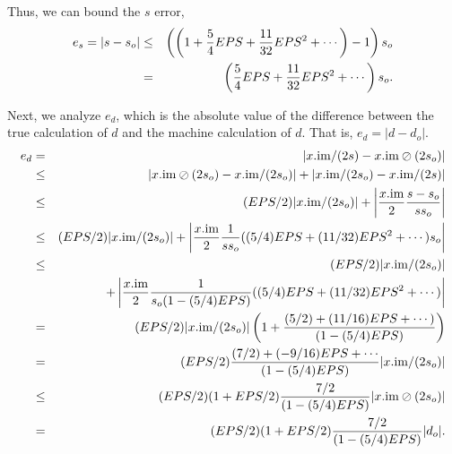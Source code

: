 Thus, we can bound the $s$ error, 
\begin{eqnarray*}
e_s = |s - s_o|&\le&\left(\left(1 + {5 \over 4} EPS + {11 \over 32} EPS^2 +\cdots\right) - 1\right) s_o\\
&=& \left({5 \over 4} EPS +
{11 \over 32} EPS^2 +\cdots\right) s_o.
\end{eqnarray*}

Next, we analyze $e_d$, which is the absolute value of the difference between the true calculation of $d$ and the machine calculation of $d$.  That is, $e_d = |d - d_o|.$
\begin{eqnarray*}
e_d &=& |x.{\rm im}/(2s) - x.{\rm im} \oslash (2 s_o)|\\
&\le& |x.{\rm im} \oslash (2 s_o) - x.{\rm im} / (2 s_o)| + 
|x.{\rm im}/(2s_o) - x.{\rm im}/(2s) |\\
&\le& (EPS/2) |x.{\rm im} / (2 s_o)| + \left|{x.{\rm im} \over 2} {s - s_o \over s s_o} \right|\\
&\le& (EPS/2) |x .{\rm im}/ (2
s_o)| +\left|{x.{\rm im} \over 2} {1 \over s s_o} ((5/4)EPS + (11/32)EPS^2+\cdots) s_o\right|\\
&\le& (EPS/2) |x.{\rm im} / (2
s_o)| \\
&&+ \left|{x.{\rm im} \over 2} {1 \over s_o (1 - (5/4)EPS)}((5/4)EPS + (11/32)EPS^2+\cdots)\right|\\
&= &(EPS/2) |x .{\rm
im}/ (2 s_o)| \left(1 + {(5/2) + (11/16)EPS+\cdots) \over (1 - (5/4)EPS)}\right)\\
&= &(EPS/2) {(7/2) + (-9/16) EPS +\cdots\over
(1 - (5/4)EPS)} |x .{\rm im}/ (2 s_o)|\\
&\le& (EPS/2) (1+EPS/2)
 {7/2 \over (1 - (5/4)EPS)}
|x .{\rm im} \oslash (2 s_o)|\\
&= &(EPS/2) (1+EPS/2)
 {7/2 \over (1 - (5/4)EPS)}
|d_o|.
\end{eqnarray*}
 
